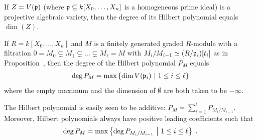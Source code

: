 \documentclass[a4paper,parskip=half,numbers=enddot, DIV=12]{scrreprt}
\begin{document}
\begin{prop}
    \begin{alphanumerate}
    \item {}
        If $Z=V(\mathfrak{p})$ (where $\mathfrak{p}\subseteq k[X_0,\ldots, X_n]$ is a homogeneous prime ideal) is a projective algebraic variety, then the degree of its Hilbert polynomial equals $\dim(Z)$.
    \item 
        If $R=k[X_0,\ldots, X_n]$ and $M$ is a finitely generated graded $R$-module with a filtration $0=M_0\subsetneq M_1\subsetneq\ldots\subsetneq M_\ell=M$ with $M_i/M_{i-1}\simeq (R/\mathfrak{p}_i)[t_i]$ as in Proposition~, then the degree of the Hilbert polynomial $P_M$ equals
        \begin{align*}
            \deg P_M=\max\left\{\dim V(\mathfrak{p}_i)\ \middle|\  1\leq i\leq \ell\right\}
        \end{align*}
        where the empty maximum and the dimension of $\emptyset$ are both taken to be $-\infty$.
    \end{alphanumerate}
\end{prop}
\begin{rem*}
    The Hilbert polynomial is easily seen to be additive: $P_M=\sum_{i=1}^\ell P_{M_i/M_{i-1}}$. Moreover, Hilbert polynomials always have positive leading coefficients such that 
    \begin{align*}
    	\deg P_M = \max\left\{\deg P_{M_i/M_{i-1}}\ \middle|\  1\leq i\leq \ell\right\}\;.
    \end{align*}
\end{rem*}
\end{document}
